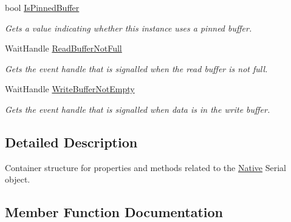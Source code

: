 \begin{DoxyCompactItemize}
bool \mbox{\hyperlink{interface_r_j_c_p_1_1_i_o_1_1_ports_1_1_native_1_1_i_serial_buffer_serial_data_ad7ace29666319cac49b20929d6d8dfac}{Is\+Pinned\+Buffer}}
\begin{DoxyCompactList}\small\item\em Gets a value indicating whether this instance uses a pinned buffer. \end{DoxyCompactList}\item 
Wait\+Handle \mbox{\hyperlink{interface_r_j_c_p_1_1_i_o_1_1_ports_1_1_native_1_1_i_serial_buffer_serial_data_aab74be44e14238f442db0d800bbf338e}{Read\+Buffer\+Not\+Full}}
\begin{DoxyCompactList}\small\item\em Gets the event handle that is signalled when the read buffer is not full. \end{DoxyCompactList}\item 
Wait\+Handle \mbox{\hyperlink{interface_r_j_c_p_1_1_i_o_1_1_ports_1_1_native_1_1_i_serial_buffer_serial_data_a5a044ebedf10f9a8510c5cd79ae6076c}{Write\+Buffer\+Not\+Empty}}
\begin{DoxyCompactList}\small\item\em Gets the event handle that is signalled when data is in the write buffer. \end{DoxyCompactList}\end{DoxyCompactItemize}


\subsection{Detailed Description}
Container structure for properties and methods related to the \mbox{\hyperlink{namespace_r_j_c_p_1_1_i_o_1_1_ports_1_1_native}{Native}} Serial object. 



\subsection{Member Function Documentation}
\mbox{\label{interface_r_j_c_p_1_1_i_o_1_1_ports_1_1_native_1_1_i_serial_buffer_serial_data_a1b24707b45bce02373256166d7e2edbf}} 
